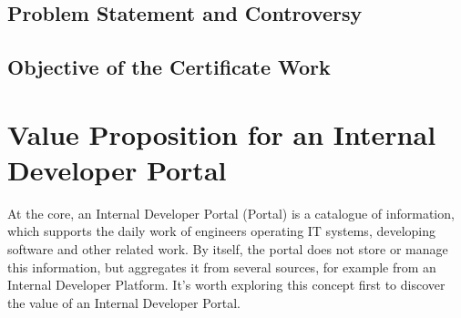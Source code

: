 \documentclass[a4paper,12pt]{article}
\begin{document}
    \subsection{Problem Statement and Controversy}
    \label{subsec:iproblemstatement}

    \subsection{Objective of the Certificate Work}
    \label{subsec:iobjective}

    \pagebreak


    \section{Value Proposition for an Internal Developer Portal}
    \label{sec:vp}
    At the core, an Internal Developer Portal (Portal) is a catalogue of information, which supports the daily work of
    engineers operating IT systems, developing software and other related work.
    By itself, the portal does not store or manage this information, but aggregates it from several sources, for example
    from an Internal Developer Platform.
    It's worth exploring this concept first to discover the value of an Internal Developer Portal.
\end{document}
